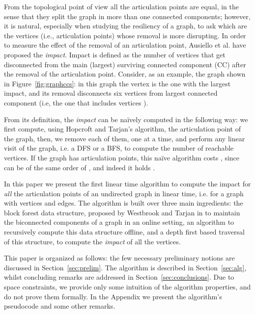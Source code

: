 \documentclass{llncs}
\begin{document}
From the topological point of view all the articulation points are equal, in the sense that they split the graph in more than one connected components; however, it is natural, especially when studying the resiliency of a graph, to ask which are the vertices (i.e., articulation points) whose removal is more disrupting. In order to measure the effect of the removal of an articulation point, Ausiello et al. \cite{AFL12} have proposed the \emph{impact}. Impact is defined as the number of vertices that get disconnected from the main (largest) surviving connected component (CC) after the removal of the articulation point. Consider, as an example, the graph shown in Figure~\ref{fig:graphccs}: in this graph the vertex  is the one with the largest impact, and its removal disconnects six vertices from largest connected component (i.e, the one that includes vertices ).

From its definition, the \emph{impact} can be na\"ively computed in the following way: we first compute, using Hopcroft and Tarjan's algorithm, the articulation point of the graph, then, we remove each of them, one at a time, and perform any linear visit of the graph, i.e. a DFS or a BFS, to compute the number of reachable vertices. If the graph has  articulation points, this na\"ive algorithm costs , since  can be of the same order of , and indeed it holds .

In this paper we present the first linear time algorithm to compute the impact for \emph{all} the articulation points of an undirected graph in linear time, i.e.  for a graph with  vertices and  edges. The algorithm is built over three main ingredients: the block forest data structure, proposed by Westbrook and Tarjan in \cite{WT92} to maintain the biconnected components of a graph in an online setting, an algorithm to recursively compute this data structure offline, and a depth first based traversal of this structure, to compute the \emph{impact} of all the vertices. 

This paper is organized as follows: the few necessary preliminary notions are discussed in Section~\ref{sec:prelim}. The algorithm is described in Section~\ref{sec:alg}, whilst concluding remarks are addressed in Section~\ref{sec:conclusions}. Due to space constraints, we provide only some intuition of the algorithm properties, and do not prove them formally. In the Appendix we present the algorithm's pseudocode and some other remarks.
\end{document}
